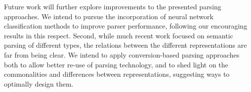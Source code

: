 \documentclass[11pt]{article}
\begin{document}
Future work will further explore improvements to the presented parsing approaches.
We intend to pursue the incorporation of neural network classification methods to
improve parser performance, following our encouraging results in this respect.
Second, while much recent work focused on semantic parsing of different types,
the relations between the different representations are far from being clear.
We intend to apply conversion-based parsing approaches both to allow better re-use
of parsing technology, and to shed light on the commonalities and differences
between representations, suggesting ways to optimally design them.






\end{document}
